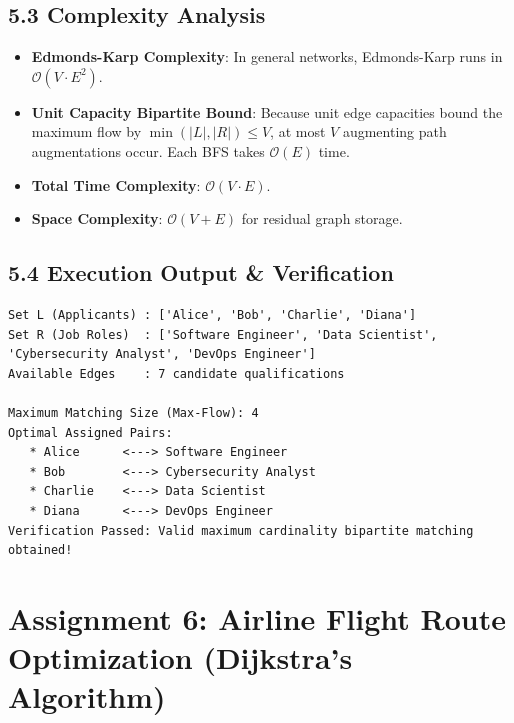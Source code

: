 \documentclass[12pt]{article}
\begin{document}
\subsection*{5.3 Complexity Analysis}
\begin{itemize}
    \item \textbf{Edmonds-Karp Complexity}: In general networks, Edmonds-Karp runs in $\mathcal{O}(V \cdot E^2)$.
    \item \textbf{Unit Capacity Bipartite Bound}: Because unit edge capacities bound the maximum flow by $\min(|L|, |R|) \le V$, at most $V$ augmenting path augmentations occur. Each BFS takes $\mathcal{O}(E)$ time.
    \item \textbf{Total Time Complexity}: $\mathcal{O}(V \cdot E)$.
    \item \textbf{Space Complexity}: $\mathcal{O}(V + E)$ for residual graph storage.
\end{itemize}

\subsection*{5.4 Execution Output \& Verification}
\begin{lstlisting}
Set L (Applicants) : ['Alice', 'Bob', 'Charlie', 'Diana']
Set R (Job Roles)  : ['Software Engineer', 'Data Scientist', 'Cybersecurity Analyst', 'DevOps Engineer']
Available Edges    : 7 candidate qualifications

Maximum Matching Size (Max-Flow): 4
Optimal Assigned Pairs:
   * Alice      <---> Software Engineer
   * Bob        <---> Cybersecurity Analyst
   * Charlie    <---> Data Scientist
   * Diana      <---> DevOps Engineer
Verification Passed: Valid maximum cardinality bipartite matching obtained!
\end{lstlisting}

\newpage

\section*{Assignment 6: Airline Flight Route Optimization (Dijkstra's Algorithm)}
\end{document}
